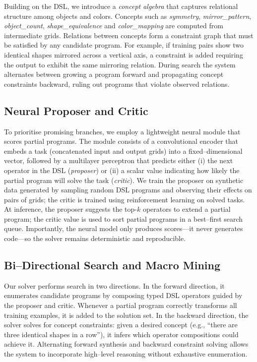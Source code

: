 \documentclass{article}
\begin{document}
Building on the DSL, we introduce a \emph{concept algebra} that captures relational structure among objects and colors.  Concepts such as \textit{symmetry}, \textit{mirror\_pattern}, \textit{object\_count}, \textit{shape\_equivalence} and \textit{color\_mapping} are computed from intermediate grids.  Relations between concepts form a constraint graph that must be satisfied by any candidate program.  For example, if training pairs show two identical shapes mirrored across a vertical axis, a constraint is added requiring the output to exhibit the same mirroring relation.  During search the system alternates between growing a program forward and propagating concept constraints backward, ruling out programs that violate observed relations.

\subsection{Neural Proposer and Critic}
To prioritise promising branches, we employ a lightweight neural module that scores partial programs.  The module consists of a convolutional encoder that embeds a task (concatenated input and output grids) into a fixed--dimensional vector, followed by a multilayer perceptron that predicts either (i) the next operator in the DSL (\emph{proposer}) or (ii) a scalar value indicating how likely the partial program will solve the task (\emph{critic}).  We train the proposer on synthetic data generated by sampling random DSL programs and observing their effects on pairs of grids; the critic is trained using reinforcement learning on solved tasks.  At inference, the proposer suggests the top-$k$ operators to extend a partial program; the critic value is used to sort partial programs in a best--first search queue.  Importantly, the neural model only produces scores—it never generates code—so the solver remains deterministic and reproducible.

\subsection{Bi--Directional Search and Macro Mining}
Our solver performs search in two directions.  In the forward direction, it enumerates candidate programs by composing typed DSL operators guided by the proposer and critic.  Whenever a partial program correctly transforms all training examples, it is added to the solution set.  In the backward direction, the solver solves for concept constraints: given a desired concept (e.g., “there are three identical shapes in a row”), it infers which operator compositions could achieve it.  Alternating forward synthesis and backward constraint solving allows the system to incorporate high--level reasoning without exhaustive enumeration.
\end{document}
